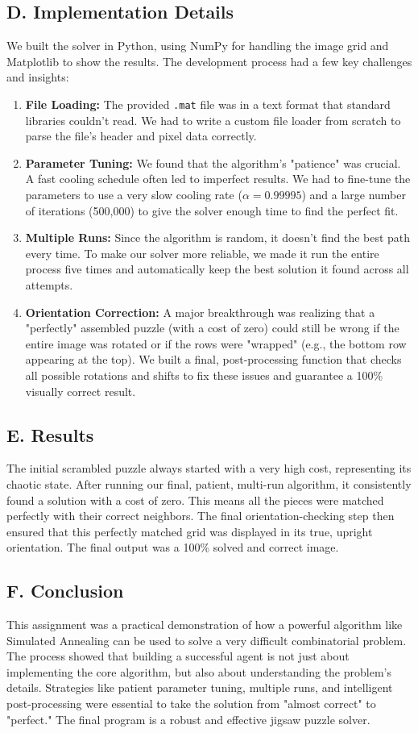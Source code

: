 \documentclass[10pt, a4paper, twocolumn]{article}
\begin{document}
\subsection*{D. Implementation Details}
We built the solver in Python, using NumPy for handling the image grid and Matplotlib to show the results. The development process had a few key challenges and insights:

\begin{enumerate}
    \item \textbf{File Loading:} The provided \texttt{.mat} file was in a text format that standard libraries couldn't read. We had to write a custom file loader from scratch to parse the file's header and pixel data correctly.
    \item \textbf{Parameter Tuning:} We found that the algorithm's "patience" was crucial. A fast cooling schedule often led to imperfect results. We had to fine-tune the parameters to use a very slow cooling rate ($\alpha = 0.99995$) and a large number of iterations (500,000) to give the solver enough time to find the perfect fit.
    \item \textbf{Multiple Runs:} Since the algorithm is random, it doesn't find the best path every time. To make our solver more reliable, we made it run the entire process five times and automatically keep the best solution it found across all attempts.
    \item \textbf{Orientation Correction:} A major breakthrough was realizing that a "perfectly" assembled puzzle (with a cost of zero) could still be wrong if the entire image was rotated or if the rows were "wrapped" (e.g., the bottom row appearing at the top). We built a final, post-processing function that checks all possible rotations and shifts to fix these issues and guarantee a 100\% visually correct result.
\end{enumerate}

\subsection*{E. Results}
The initial scrambled puzzle always started with a very high cost, representing its chaotic state. After running our final, patient, multi-run algorithm, it consistently found a solution with a cost of zero. This means all the pieces were matched perfectly with their correct neighbors. The final orientation-checking step then ensured that this perfectly matched grid was displayed in its true, upright orientation. The final output was a 100\% solved and correct image.

\subsection*{F. Conclusion}
This assignment was a practical demonstration of how a powerful algorithm like Simulated Annealing can be used to solve a very difficult combinatorial problem. The process showed that building a successful agent is not just about implementing the core algorithm, but also about understanding the problem's details. Strategies like patient parameter tuning, multiple runs, and intelligent post-processing were essential to take the solution from "almost correct" to "perfect." The final program is a robust and effective jigsaw puzzle solver.
\end{document}
